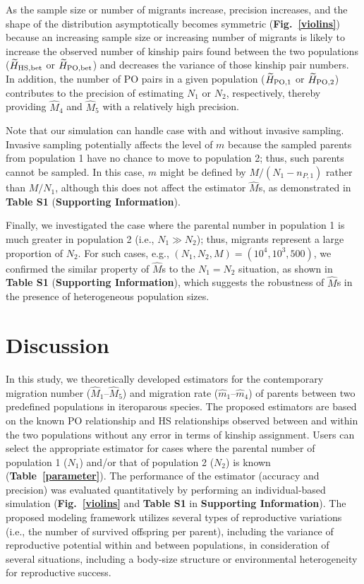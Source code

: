 \documentclass[12pt, English]{article}
\begin{document}
\begin{spacing}{1.9}
As the sample size or number of migrants increase, precision increases, and the shape of the distribution asymptotically becomes symmetric ({\bf Fig.~\ref{violins}}) because an increasing sample size or increasing number of migrants is likely to increase the observed number of kinship pairs found between the two populations ($\widetilde{H}_{\rm HS,bet}$ or $\widetilde{H}_{\rm PO,bet}$) and decreases the variance of those kinship pair numbers. In addition, the number of PO pairs in a given population ($\widetilde{H}_{\rm PO,1}$ or $\widetilde{H}_{\rm PO,2}$) contributes to the precision of estimating $N_1$ or $N_2$, respectively, thereby providing ${\hat M_4}$ and ${\hat M_5}$ with a relatively high precision. 

Note that our simulation can handle case with and without invasive sampling. Invasive sampling potentially affects the level of $m$ because the sampled parents from population 1 have no chance to move to population 2; thus, such parents cannot be sampled. In this case, $m$ might be defined by $M/(N_1-n_{P,1})$ rather than $M/N_1$, although this does not affect the estimator ${\hat M}$s, as demonstrated in {\bf Table S1} ({\bf Supporting Information}). 

Finally, we investigated the case where the parental number in population 1 is much greater in population 2 (i.e., $N_1 \gg N_2$); thus, migrants represent a  large proportion of $N_2$. For such cases, e.g., $(N_1,N_2,M)=(10^4,10^3,500)$, we confirmed the similar property of ${\hat M}$s to the $N_1 = N_2$ situation, as shown in {\bf Table S1} ({\bf Supporting Information}), which suggests the robustness of ${\hat M}$s in the presence of heterogeneous population sizes.   

\section{Discussion}\label{sec4}

In this study, we theoretically developed estimators for the contemporary migration number (${\hat M_1}$--${\hat M_5}$) and migration rate (${\hat m_1}$--${\hat m_4}$) of parents between two predefined populations in iteroparous species. The proposed estimators are based on the known PO relationship and HS relationships observed between and within the two populations without any error in terms of kinship assignment. Users can select the appropriate estimator for cases where the parental number of population 1 ($N_1$) and/or that of population 2 ($N_2$) is known ({\bf Table~\ref{parameter}}). The performance of the estimator (accuracy and precision) was evaluated quantitatively by performing an individual-based simulation ({\bf Fig.~\ref{violins}} and {\bf Table S1} in {\bf Supporting Information}). The proposed modeling framework utilizes several types of reproductive variations (i.e., the number of survived offspring per parent), including the variance of reproductive potential within and between populations, in consideration of several situations, including a body-size structure or environmental heterogeneity for reproductive success.


\end{spacing}
\end{document}
